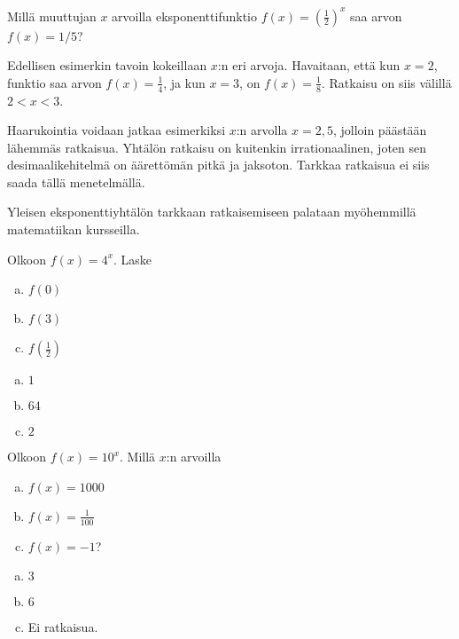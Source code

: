 \begin{esimerkki}
Millä muuttujan $x$ arvoilla eksponenttifunktio
$f(x) = \left( \frac{1}{2} \right)^{x}$ saa arvon
$f(x) = 1/5$?

Edellisen esimerkin tavoin kokeillaan $x$:n eri arvoja. Havaitaan,
että kun $x = 2$, funktio saa arvon $f(x) = \frac{1}{4}$, ja
kun $x = 3$, on $f(x) = \frac{1}{8}$. Ratkaisu on siis välillä
$2 < x < 3$.

Haarukointia voidaan jatkaa esimerkiksi $x$:n arvolla $x = 2,5$,
jolloin päästään lähemmäs ratkaisua. Yhtälön ratkaisu on kuitenkin
irrationaalinen, joten sen desimaalikehitelmä on äärettömän pitkä ja
jaksoton. Tarkkaa ratkaisua ei siis saada tällä menetelmällä.

Yleisen eksponenttiyhtälön tarkkaan ratkaisemiseen palataan myöhemmillä
matematiikan kursseilla.
\end{esimerkki}

\begin{tehtava}
Olkoon $f(x) = 4^x$. Laske
\begin{enumerate}[a)]
\item $f(0)$
\item $f(3)$
\item $f(\frac{1}{2})$
\end{enumerate}
\begin{vastaus}
\begin{enumerate}[a)]
\item $1$
\item $64$
\item $2$
\end{enumerate}
\end{vastaus}
\end{tehtava}

\begin{tehtava}
Olkoon $f(x) = 10^x$. Millä $x$:n arvoilla
\begin{enumerate}[a)]
\item $f(x) = 1000$
\item $f(x) = \frac{1}{100}$
\item $f(x) = -1$?
\end{enumerate}
\begin{vastaus}
\begin{enumerate}[a)]
\item $3$
\item $6$
\item Ei ratkaisua.
\end{enumerate}
\end{vastaus}
\end{tehtava}

